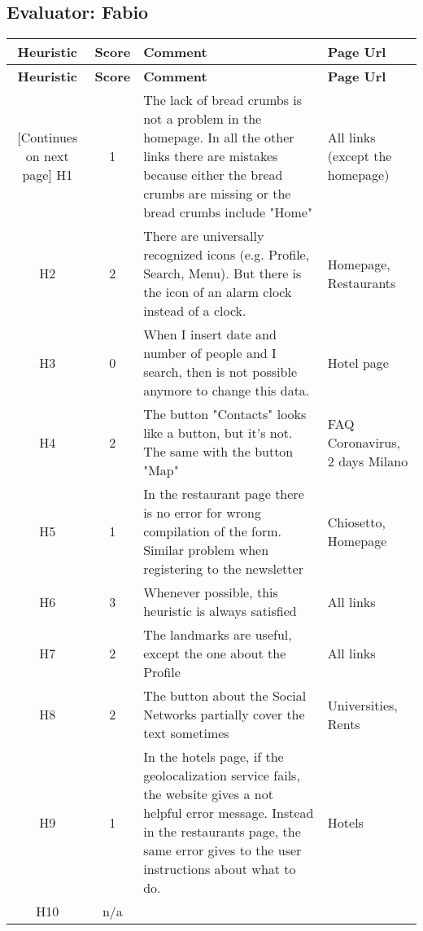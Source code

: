\pagebreak

\subsection{Evaluator: Fabio}
\begin{tabularx}{\linewidth}{c c X p{3cm}}
    \textbf{Heuristic} & \textbf{Score} & \textbf{Comment} & \textbf{Page Url}
    \\ \midrule
    \endfirsthead
    \toprule
    \textbf{Heuristic} & \textbf{Score} & \textbf{Comment} & \textbf{Page Url}
    \\ \midrule
    \endhead
    \midrule
    \footnotesize [Continues on next page]
    \endfoot
    \bottomrule
    \endlastfoot
    H1 & 1 & The lack of bread crumbs is not a problem in the homepage.
    In all the other links there are mistakes because either the bread crumbs are missing or the bread crumbs include "Home" & All links (except the homepage)\\ \midrule
    H2 & 2 & There are universally recognized icons (e.g. Profile, Search, Menu). But there is the icon of an alarm clock instead of a clock. & Homepage, Restaurants \\ \midrule
    H3 & 0 & When I insert date and number of people and I search, then is not possible anymore to change this data.& Hotel page\\ \midrule
    H4 & 2 & The button "Contacts" looks like a button, but it's not. The same with the button "Map" & FAQ Coronavirus, 2 days Milano\\ \midrule
    H5 & 1 & In the restaurant page there is no error for wrong compilation of the form. Similar problem when registering to the newsletter& Chiosetto, Homepage\\ \midrule
    H6 & 3 & Whenever possible, this heuristic is always satisfied& All links\\ \midrule
    H7 & 2 & The landmarks are useful, except the one about the Profile & All links\\ \midrule
    H8 & 2 & The button about the Social Networks partially cover the text sometimes & Universities, Rents\\ \midrule
    H9 & 1 & In the hotels page, if the geolocalization service fails, the website gives a not helpful error message. Instead in the restaurants page, the same error gives to the user instructions about what to do. & Hotels \\ \midrule
    H10 & n/a & &
\end{tabularx}
    
